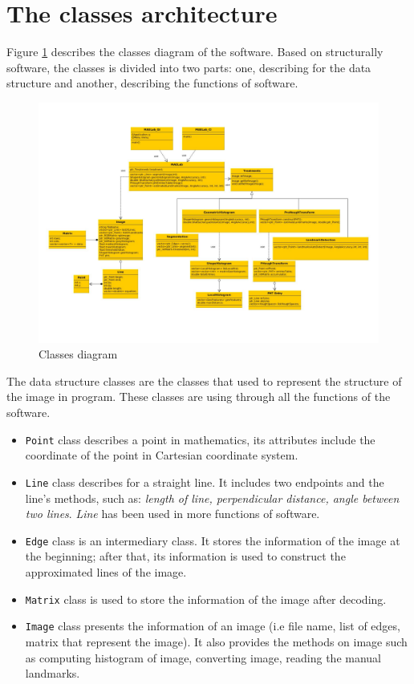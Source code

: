 \section{The classes architecture}
Figure \ref{figclassdiagram} describes the classes diagram of the software. Based on structurally software, the classes is divided into two parts: one, describing for the data structure and another, describing the functions of software.
\begin{figure}[h]
	\centering
	\includegraphics[scale=0.85, angle = -90]{images/classDiagram}
	\caption{Classes diagram}
	\label{figclassdiagram}
\end{figure}
The data structure classes are the classes that used to represent the structure of the image in program. These classes are using through all the functions of the software.
\begin{itemize}
	\item \texttt{Point} class describes a point in mathematics, its attributes include the coordinate of the point in Cartesian coordinate system.
	\item \texttt{Line} class describes for a straight line. It includes two endpoints and the line's methods, such as: \textit{length of line, perpendicular distance, angle between two lines}. \textit{Line} has been used in more functions of software.
	\item \texttt{Edge} class is an intermediary class. It stores the information of the image at the beginning; after that, its information is used to construct the approximated lines of the image.
	\item \texttt{Matrix} class is used to store the information of the image after decoding.
	\item \texttt{Image} class presents the information of an image (i.e file name, list of edges, matrix that represent the image). It also provides the methods on image such as computing histogram of image, converting image, reading the manual landmarks.
\end{itemize} 
